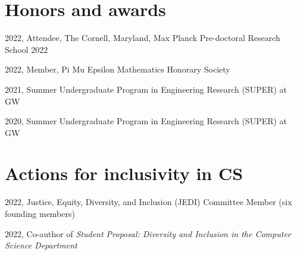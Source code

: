 \documentclass[letterpaper]{article}
\renewenvironment{itemize}{
  \begin{list}{}{
    \setlength{\leftmargin}{1.5em}
  }
}{
  \end{list}
}
\begin{document}
\section*{Honors and awards}

\begin{itemize}
\item 2022, Attendee, The Cornell, Maryland, Max Planck Pre-doctoral Research School 2022
\item 2022, Member, Pi Mu Epsilon Mathematics Honorary Society
\item 2021, Summer Undergraduate Program in Engineering Research (SUPER) at GW
\item 2020, Summer Undergraduate Program in Engineering Research (SUPER) at GW
\end{itemize}


\section*{Actions for inclusivity in CS}
\begin{itemize}
\item 
2022, Justice, Equity, Diversity, and Inclusion (JEDI) Committee Member (six founding members)

\item
2022, Co-author of \emph{Student Proposal: Diversity and Inclusion in the Computer Science Department} 
\end{itemize}
\end{document}
